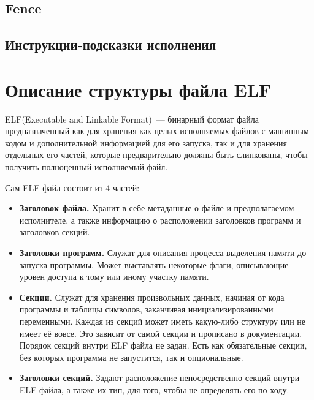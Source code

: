 \documentclass[14pt, russian, onesize]{extreport}
\begin{document}
\subsection*{Fence}

\subsection*{Инструкции-подсказки исполнения}

\section*{Описание структуры файла ELF}
ELF(Executable and Linkable Format)~--- бинарный формат файла предназначенный
как для хранения как целых исполняемых файлов с машинным кодом и дополнительной
информацией для его запуска, так и для хранения отдельных его частей, которые
предварительно должны быть слинкованы, чтобы получить полноценный исполняемый
файл. 

Сам ELF файл состоит из 4 частей:
\begin{itemize}
    \item \textbf{Заголовок файла.}
        Хранит в себе метаданные о файле и предполагаемом исполнителе,
        а также информацию о расположении заголовков программ и заголовков секций.
    \item \textbf{Заголовки программ.}
        Служат для описания процесса выделения памяти до запуска программы. 
        Может выставлять некоторые флаги, описывающие уровен доступа
        к тому или иному участку памяти.
    \item \textbf{Секции.}
        Служат для хранения произвольных данных, начиная от кода программы
        и таблицы символов, заканчивая инициализированными переменными.
        Каждая из секций может иметь какую-либо структуру или не имеет
        её вовсе. Это зависит от самой секции и прописано в документации.
        Порядок секций внутри ELF файла не задан. Есть как обязательные
        секции, без которых программа не запустится, так и опциональные.
    \item \textbf{Заголовки секций.}
        Задают расположение непосредственно секций внутри ELF файла,
        а также их тип, для того, чтобы не определять его по ходу.
\end{itemize}
\end{document}
